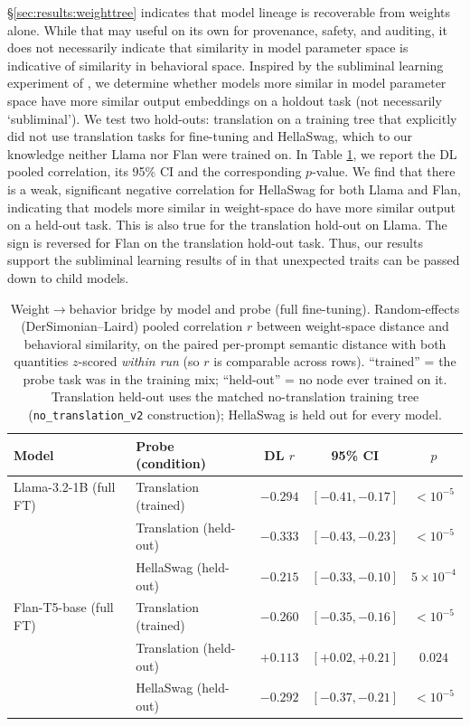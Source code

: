 \documentclass{article}
\theoremstyle{definition}
\theoremstyle{plain}
\begin{document}
\S \ref{sec:results:weighttree} indicates that model lineage is recoverable from weights alone.  While that may useful on its own for provenance, safety, and auditing, it does not necessarily indicate that similarity in model parameter space is indicative of similarity in behavioral space.  Inspired by the subliminal learning experiment of \citet{cloud2025subliminal}, we determine whether models more similar in model parameter space have more similar output embeddings on a holdout task (not necessarily `subliminal').  We test two hold-outs: translation on a training tree that explicitly did not use translation tasks for fine-tuning and HellaSwag, which to our knowledge neither Llama nor Flan were trained on.  In Table \ref{tab:behavior_holdout}, we report the DL pooled correlation, its 95\% CI and the corresponding $p$-value.  We find that there is a weak, significant negative correlation for HellaSwag for both Llama and Flan, indicating that models more similar in weight-space do have more similar output on a held-out task.  This is also true for the translation hold-out on Llama.  The sign is reversed for Flan on the translation hold-out task.  Thus, our results support the subliminal learning results of \citet{cloud2025subliminal} in that unexpected traits can be passed down to child models.





\begin{table}[t]
\caption{Weight$\to$behavior bridge by model and probe (full fine-tuning). Random-effects
(DerSimonian--Laird) pooled correlation $r$ between weight-space distance and behavioral similarity,
on the paired per-prompt semantic distance with both quantities $z$-scored \emph{within run} (so $r$
is comparable across rows). ``trained'' = the probe task was in the training mix; ``held-out'' = no
node ever trained on it. Translation held-out uses the matched no-translation training tree
(\texttt{no\_translation\_v2} construction); HellaSwag is held out for every model.}
\label{tab:behavior_holdout}
\centering
\begin{tabular}{llccc}
\toprule
Model & Probe (condition) & DL $r$ & 95\% CI & $p$ \\
\midrule
Llama-3.2-1B (full FT) & Translation (trained)  & $-0.294$ & $[-0.41, -0.17]$ & $<10^{-5}$ \\
                       & Translation (held-out) & $-0.333$ & $[-0.43, -0.23]$ & $<10^{-5}$ \\
                       & HellaSwag (held-out)   & $-0.215$ & $[-0.33, -0.10]$ & $5\times10^{-4}$ \\
\midrule
Flan-T5-base (full FT) & Translation (trained)  & $-0.260$ & $[-0.35, -0.16]$ & $<10^{-5}$ \\
                       & Translation (held-out) & $+0.113$ & $[+0.02, +0.21]$ & $0.024$ \\
                       & HellaSwag (held-out)   & $-0.292$ & $[-0.37, -0.21]$ & $<10^{-5}$ \\
\bottomrule
\end{tabular}
\end{table}
\end{document}
